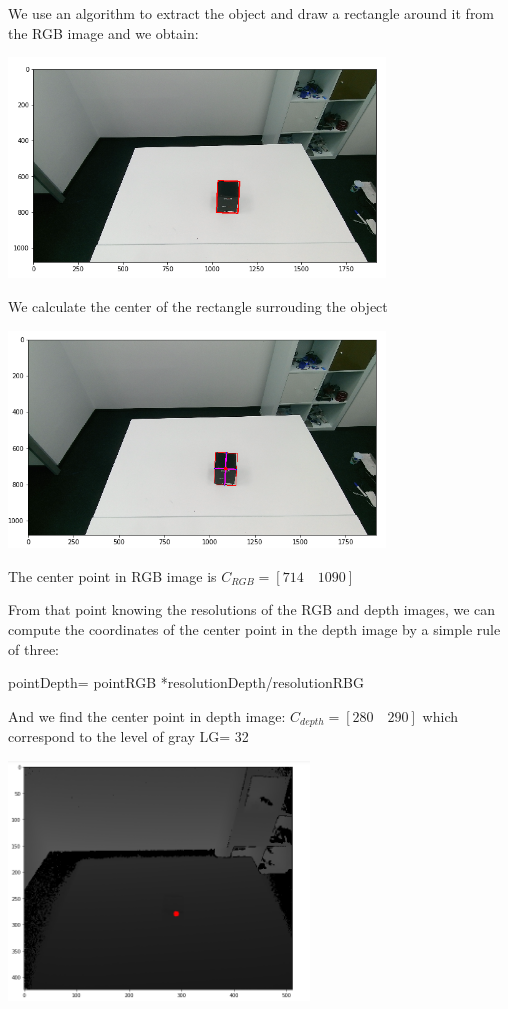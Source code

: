 \documentclass[12pt,a4paper]{report}
\begin{document}
We use an algorithm to extract the object and draw a rectangle around it from the RGB image and we obtain:
\begin{center}
\includegraphics[width=10cm]{Capture6.png}
\end{center}

We calculate the center of the rectangle surrouding the object
\begin{center}
\includegraphics[width=10cm]{Capture7.png}
\end{center}

The center point in RGB image is  $C_{RGB}= [714\quad 1090]$

From that point knowing the resolutions of the RGB and depth images, we can compute the coordinates of the center point in the depth image by a simple rule of three:

pointDepth= pointRGB *resolutionDepth/resolutionRBG 

And we find the center point in depth image:  $C_{depth}= [280\quad 290]$ which correspond to the level of gray LG= 32 
\begin{center}
\includegraphics[width=8cm]{Capture8.png}
\end{center}
\end{document}
